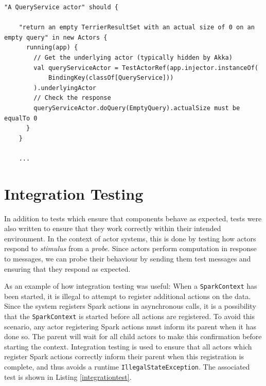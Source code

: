 \documentclass{l4proj}
\newcommand{\code}[1]{\texttt{#1}}
\begin{document}
\begin{lstlisting}[label=test,caption={Testing the internal behaviour of an actor.}]
"A QueryService actor" should {

    "return an empty TerrierResultSet with an actual size of 0 on an empty query" in new Actors {
      running(app) {
        // Get the underlying actor (typically hidden by Akka)
        val queryServiceActor = TestActorRef(app.injector.instanceOf(
            BindingKey(classOf[QueryService]))
        ).underlyingActor
        // Check the response
        queryServiceActor.doQuery(EmptyQuery).actualSize must be equalTo 0
      }
    }
    
    ...
\end{lstlisting}
    
        
\section{Integration Testing}
    In addition to tests which ensure that components behave as expected, tests were also written to ensure that they work correctly within their intended environment. In the context of actor systems, this is done by testing how actors respond to \textit{stimulus} from a \textit{probe}. Since actors perform computation in response to messages, we can probe their behaviour by sending them test messages and ensuring that they respond as expected.
    
    As an example of how integration testing was useful: When a \code{SparkContext} has been started, it is illegal to attempt to register additional actions on the data. Since the system registers Spark actions in asynchronous calls, it is a possibility that the \code{SparkContext} is started before all actions are registered. To avoid this scenario, any actor registering Spark actions must inform its parent when it has done so. The parent will wait for all child actors to make this confirmation before starting the context. Integration testing is used to ensure that all actors which register Spark actions correctly inform their parent when this registration is complete, and thus avoids a runtime \code{IllegalStateException}. The associated test is shown in Listing \ref{integrationtest}.
    
\end{document}
